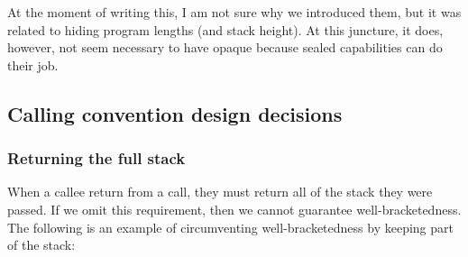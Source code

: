 \documentclass[a4paper]{article}
\begin{document}
At the moment of writing this, I am not sure why we introduced them, but it was related to hiding program lengths (and stack height).
At this juncture, it does, however, not seem necessary to have opaque because sealed capabilities can do their job.

\subsection{Calling convention design decisions}
\subsubsection{Returning the full stack}
When a callee return from a call, they must return all of the stack they were passed. If we omit this requirement, then we cannot guarantee well-bracketedness. The following is an example of circumventing well-bracketedness by keeping part of the stack:
\end{document}

